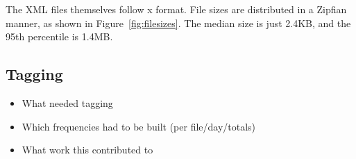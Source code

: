 
The XML files themselves follow x format. File sizes are distributed in a Zipfian manner, as shown in Figure~\ref{fig:filesizes}. The median size is just 2.4KB, and the 95th percentile is 1.4MB.




\subsection{Tagging}
\begin{itemize}
    \item What needed tagging
    \item Which frequencies had to be built (per file/day/totals)
    \item What work this contributed to
\end{itemize}

